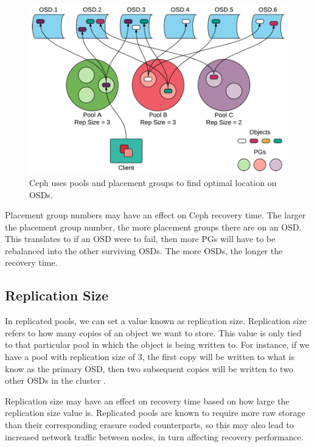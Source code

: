 \documentclass[conference,compsoc]{IEEEtran}
\begin{document}
\begin{figure}

\includegraphics[width=\linewidth]{Pools.png}
\caption{Ceph uses pools and placement groups to find optimal location on OSDs.}
\label{fig:Pools}

\end{figure}

Placement group numbers may have an effect on Ceph recovery time. The larger the placement group number, the more placement groups there are on an OSD. This translates to if an OSD were to fail, then more PGs will have to be rebalanced into the other surviving OSDs. The more OSDs, the longer the recovery time. 

\subsection{Replication Size}
In replicated pools, we can set a value known as replication size. Replication size refers to how many copies of an object we want to store. This value is only tied to that particular pool in which the object is being written to. For instance, if we have a pool with replication size of 3, the first copy will be written to what is know as the primary OSD, then two subsequent copies will be written to two other OSDs in the cluster \cite{weil_high-performance}. 

Replication size may have an effect on recovery time based on how large the replication size value is. Replicated pools are known to require more raw storage than their corresponding erasure coded counterparts, so this may also lead to increased network traffic between nodes, in turn affecting recovery performance. 
\end{document}
